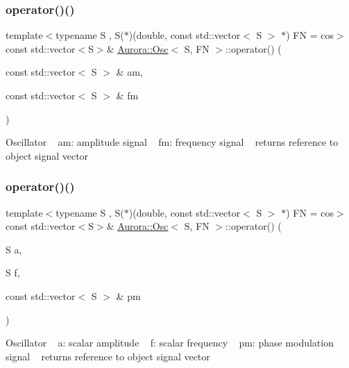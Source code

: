 \subsubsection{\texorpdfstring{operator()()}{operator()()}\hspace{0.1cm}{\footnotesize\ttfamily [4/6]}}
{\footnotesize\ttfamily template$<$typename S , S($\ast$)(double, const std\+::vector$<$ S $>$ $\ast$) FN = cos$>$ \\
const std\+::vector$<$S$>$\& \hyperlink{class_aurora_1_1_osc}{Aurora\+::\+Osc}$<$ S, FN $>$\+::operator() (\begin{DoxyParamCaption}\item[{const std\+::vector$<$ S $>$ \&}]{am,  }\item[{const std\+::vector$<$ S $>$ \&}]{fm }\end{DoxyParamCaption})\hspace{0.3cm}{\ttfamily [inline]}}

Oscillator ~\newline
am\+: amplitude signal ~\newline
fm\+: frequency signal ~\newline
returns reference to object signal vector \mbox{\label{class_aurora_1_1_osc_abbef8b0aacfbc3cac66f25b774bd3a84}} 
\subsubsection{\texorpdfstring{operator()()}{operator()()}\hspace{0.1cm}{\footnotesize\ttfamily [5/6]}}
{\footnotesize\ttfamily template$<$typename S , S($\ast$)(double, const std\+::vector$<$ S $>$ $\ast$) FN = cos$>$ \\
const std\+::vector$<$S$>$\& \hyperlink{class_aurora_1_1_osc}{Aurora\+::\+Osc}$<$ S, FN $>$\+::operator() (\begin{DoxyParamCaption}\item[{S}]{a,  }\item[{S}]{f,  }\item[{const std\+::vector$<$ S $>$ \&}]{pm }\end{DoxyParamCaption})\hspace{0.3cm}{\ttfamily [inline]}}

Oscillator ~\newline
a\+: scalar amplitude ~\newline
f\+: scalar frequency ~\newline
pm\+: phase modulation signal ~\newline
returns reference to object signal vector \mbox{\label{class_aurora_1_1_osc_a6a339a71db41fbbd944dd603c986b81d}} 
